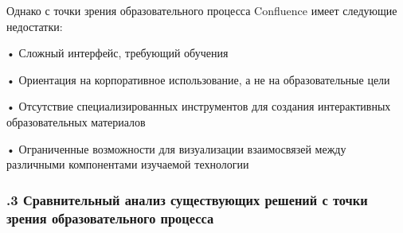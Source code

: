 {  \par \redline Однако с точки зрения образовательного процесса Confluence имеет следующие недостатки:
  
  \par \redline • Сложный интерфейс, требующий обучения
  \par \redline • Ориентация на корпоративное использование, а не на образовательные цели
  \par \redline • Отсутствие специализированных инструментов для создания интерактивных образовательных материалов
  \par \redline • Ограниченные возможности для визуализации взаимосвязей между различными компонентами изучаемой технологии

  \par
}

\subtitlespace

\subsubsection*{ 
  \gostTitleFont
  .3 Сравнительный анализ существующих решений с точки зрения образовательного процесса
} 

\subtitlespace

